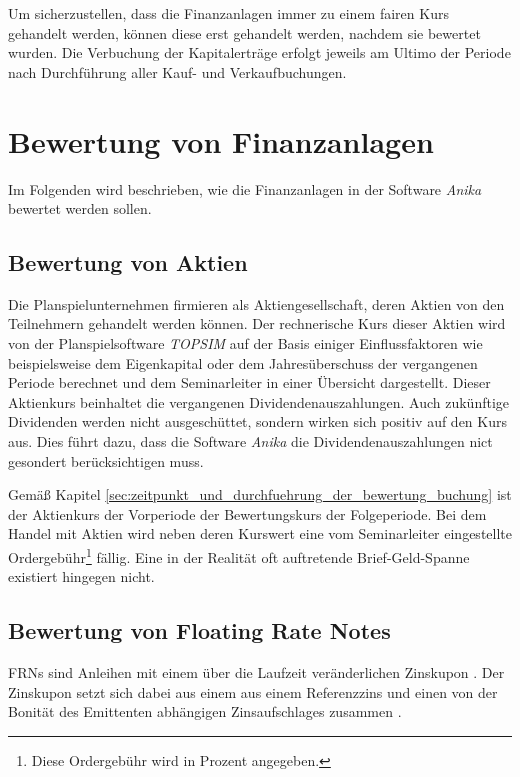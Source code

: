 \documentclass[12pt, a4paper]{article}
\theoremstyle{plain}
\begin{document}
Um sicherzustellen, dass die Finanzanlagen immer zu einem fairen Kurs gehandelt werden, können diese erst gehandelt werden, nachdem sie bewertet wurden. 
Die Verbuchung der Kapitalerträge erfolgt jeweils am Ultimo der Periode nach Durchführung aller Kauf- und Verkaufbuchungen.

\section{Bewertung von Finanzanlagen}
\label{sec:bewertung_von_finanzanlagen}
Im Folgenden wird beschrieben, wie die Finanzanlagen in der Software \textit{Anika} bewertet werden sollen.

\subsection{Bewertung von Aktien}
\label{sec:bewertung_von_aktien}
Die Planspielunternehmen firmieren als Aktiengesellschaft, deren Aktien von den Teilnehmern gehandelt werden können.
Der rechnerische Kurs dieser Aktien wird von der Planspielsoftware \textit{TOPSIM} auf der Basis einiger Einflussfaktoren wie beispielsweise dem Eigenkapital oder dem Jahresüberschuss der vergangenen Periode berechnet und dem Seminarleiter in einer Übersicht dargestellt.
Dieser Aktienkurs beinhaltet die vergangenen Dividendenauszahlungen. Auch zukünftige Dividenden werden nicht ausgeschüttet, sondern wirken sich positiv auf den Kurs aus. Dies führt dazu, dass die Software \textit{Anika} die Dividendenauszahlungen nict gesondert berücksichtigen muss.

Gemäß Kapitel \ref{sec:zeitpunkt_und_durchfuehrung_der_bewertung_buchung} ist der Aktienkurs der Vorperiode der Bewertungskurs der Folgeperiode.
Bei dem Handel mit Aktien wird neben deren Kurswert eine vom Seminarleiter eingestellte Ordergebühr\footnote{Diese Ordergebühr wird in Prozent angegeben.} fällig. Eine in der Realität oft auftretende Brief-Geld-Spanne existiert hingegen nicht.

\subsection{Bewertung von Floating Rate Notes}
\label{sec:bewertung_von_floating_rate_notes}
\glspl{FRN} sind Anleihen mit einem über die Laufzeit veränderlichen Zinskupon \autocite[][373]{fabozzi_handbook_2005}. Der Zinskupon setzt sich dabei aus einem aus einem Referenzzins und einen von der Bonität des Emittenten abhängigen Zinsaufschlages zusammen \autocite[][374]{fabozzi_handbook_2005}.
\end{document}
